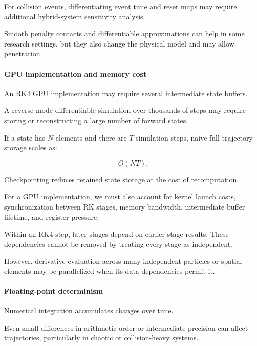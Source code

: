 For collision events, differentiating event time and reset maps may require additional hybrid-system sensitivity analysis.

Smooth penalty contacts and differentiable approximations can help in some research settings, but they also change the physical model and may allow penetration.

\paragraph{GPU implementation and memory cost}\label{02-foundations-ii-ch022-gpu-implementation-and-memory-cost}

\hypertarget{02-foundations-ii-ch022-gpu-implementation-and-memory-cost}{}

An RK4 GPU implementation may require several intermediate state buffers.

A reverse-mode differentiable simulation over thousands of steps may require storing or reconstructing a large number of forward states.

If a state has \(N\) elements and there are \(T\) simulation steps, naive full trajectory storage scales as:

\[
O(NT).
\]

Checkpointing reduces retained state storage at the cost of recomputation.

For a GPU implementation, we must also account for kernel launch costs, synchronization between RK stages, memory bandwidth, intermediate buffer lifetime, and register pressure.

Within an RK4 step, later stages depend on earlier stage results. These dependencies cannot be removed by treating every stage as independent.

However, derivative evaluation across many independent particles or spatial elements may be parallelized when its data dependencies permit it.

\paragraph{Floating-point determinism}\label{02-foundations-ii-ch022-floating-point-determinism}

\hypertarget{02-foundations-ii-ch022-floating-point-determinism}{}

Numerical integration accumulates changes over time.

Even small differences in arithmetic order or intermediate precision can affect trajectories, particularly in chaotic or collision-heavy systems.

